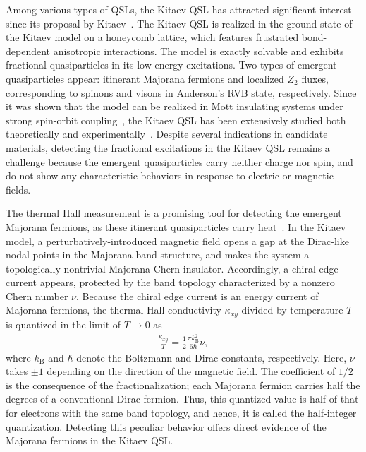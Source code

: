 \documentclass[twocolumn,superscriptaddress,showpacs, longbibliography, aps, prx]{revtex4-2}
\begin{document}
Among various types of QSLs, the Kitaev QSL has attracted significant interest since its proposal by Kitaev~\cite{Kitaev2006}. 
The Kitaev QSL is realized in the ground state of the Kitaev model on a honeycomb lattice, which features frustrated bond-dependent anisotropic interactions. 
The model is exactly solvable and exhibits fractional quasiparticles in its low-energy excitations. 
Two types of emergent quasiparticles appear: itinerant Majorana fermions and localized $Z_2$ fluxes, corresponding to spinons and visons in Anderson's RVB state, respectively.
Since it was shown that the model can be realized in Mott insulating systems under strong spin-orbit coupling~\cite{Jackeli_PRL2009}, the Kitaev QSL has been extensively studied both theoretically and experimentally~\cite{WinterTDBSGV2017, TakagiTJKN2019, KnolleM2019, JanssenV2019, Motome_JPSJ2020, TrebstH2022, RousochatzakisPLK2024}. 
Despite several indications in candidate materials, detecting the fractional excitations in the Kitaev QSL remains a challenge because the emergent quasiparticles carry neither charge nor spin, and do not show any characteristic behaviors in response to electric or magnetic fields.  

The thermal Hall measurement is a promising tool for detecting the emergent Majorana fermions, as these itinerant quasiparticles carry heat~\cite{Kitaev2006}. 
In the Kitaev model, a perturbatively-introduced magnetic field opens a gap at the Dirac-like nodal points in the Majorana band structure, and makes the system a topologically-nontrivial Majorana Chern insulator. 
Accordingly, a chiral edge current appears, protected by the band topology characterized by a nonzero Chern number $\nu$. 
Because the chiral edge current is an energy current of Majorana fermions, the thermal Hall conductivity $\kappa_{xy}$ divided by temperature $T$ is quantized in the limit of $T\to 0$ as
\begin{align}
{\frac{\kappa_{xy}}{T} = \frac{1}{2} \frac{\pi k_{\mathrm{B}}^2}{6\hbar}}\nu,
\label{eq:k_xy}
\end{align}
where $k_{\mathrm{B}}$ and $\hbar$ denote the Boltzmann and Dirac constants, respectively. 
Here, $\nu$ takes $\pm 1$ depending on the direction of the magnetic field. 
The coefficient of $1/2$ is the consequence of the fractionalization; each Majorana fermion carries half the degrees of a conventional Dirac fermion. 
Thus, this quantized value is half of that for electrons with the same band topology, and hence, it is called the half-integer quantization. 
Detecting this peculiar behavior offers direct evidence of the Majorana fermions in the Kitaev QSL.
\end{document}
